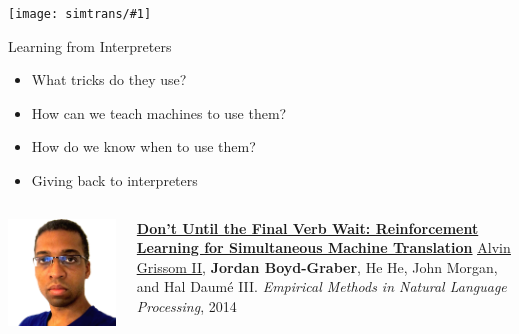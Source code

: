 \documentclass[compress]{beamer}
\newcommand{\gfxs}[2]{
\begin{center}
	\texttt{[image: simtrans/\#1]}
\end{center}
}
\begin{document}
\begin{frame}[plain]{}
\vspace*{-1pt}
  \gfxs{interpreter-screenshot}{1.0}

  \pause
  \vspace{-4cm}

  \begin{block}{Learning from Interpreters}
    \begin{itemize}
      \item What tricks do they use?
      \item How can we teach machines to use them?
      \item How do we know when to use them?
      \item Giving back to interpreters
    \end{itemize}
  \end{block}

\end{frame}



\begin{frame}{}

  \begin{columns}
        \includegraphics[width=0.9\linewidth]{general_figures/alvin}
        \begin{block}{ {\bf \href{http://cs.colorado.edu/~jbg//docs/2014_emnlp_simtrans.pdf}{Don't Until the Final Verb Wait: Reinforcement Learning for Simultaneous Machine Translation}}}
\underline{\href{http://www.umiacs.umd.edu/~alvin/}{Alvin Grissom II}}, {\bf Jordan Boyd-Graber}, He He, John Morgan, and Hal {Daum\'{e} III}.  \emph{Empirical Methods in Natural Language Processing}, 2014
        \end{block}
  \end{columns}
\end{frame}
\end{document}
